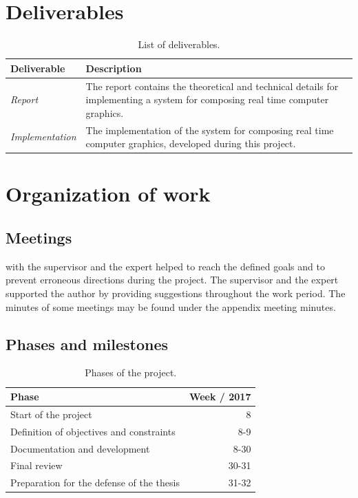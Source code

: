 \documentclass[%
    a4paper,    %
    justified,  %
    nobib,      %
    openany     %
]{tufte-book}
\begin{document}
\newpage{}

\section{Deliverables}
\label{sec:deliverables}

\begin{table}[h]
  \caption{List of deliverables.}
  \begin{tabularx}{\textwidth}{lX}
    \toprule
    \textbf{Deliverable} & \textbf{Description} \\
    \midrule
    \textit{Report} & The report contains the theoretical and technical details for
    implementing a system for composing real time computer graphics. \\
    \midrule
    \textit{Implementation} & The implementation of the system for composing real time
    computer graphics, developed during this project. \\
    \bottomrule
  \end{tabularx}
\end{table}

\section{Organization of work}
\label{sec:organization-of-work}

\subsection{Meetings}
\label{subsec:meetings}

 with the supervisor and the expert helped to reach
the defined goals and to prevent erroneous directions during the project. The
supervisor and the expert supported the author by providing suggestions
throughout the work period. The minutes of some meetings may be
found under the appendix meeting minutes.~

\subsection{Phases and milestones}
\label{subsec:project-phases-milestones}

\begin{table}[h]
  \caption{Phases of the project.}
  \begin{tabularx}{\textwidth}{Xr}
    \toprule
    \textbf{Phase}   & \textbf{Week / 2017} \\
    \midrule
    Start of the project & 8 \\
    Definition of objectives and constraints & 8-9 \\
    Documentation and development & 8-30 \\
    Final review & 30-31 \\
    Preparation for the defense of the thesis & 31-32 \\
    \bottomrule
  \end{tabularx}
\end{table}
\end{document}
